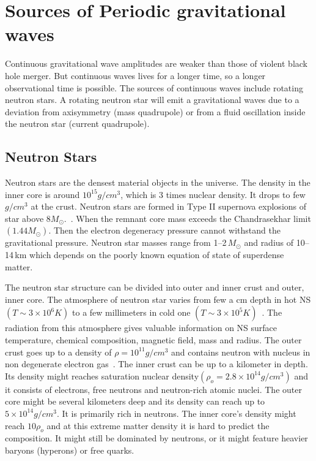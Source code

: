 \documentclass{ttuthes2007}
\begin{document}
\section{Sources of Periodic gravitational waves}
Continuous gravitational wave amplitudes are weaker than those of violent black
hole merger. But continuous waves lives for a longer time, so a longer
observational time is possible. The sources of continuous waves include
rotating neutron stars. A
rotating neutron star will emit a gravitational waves due to a deviation from
axisymmetry (mass quadrupole) or from a fluid oscillation inside the neutron
star (current quadrupole). 

\subsection{Neutron Stars}

Neutron stars are the densest material objects in the universe. The density in
the inner core is around $10^{15} g/cm^3$,
which is 3 times nuclear density. It drops to few $g/cm^3$ at the crust. Neutron
stars
are formed in Type II supernova explosions of 
star above $8M_\odot$.~\cite{Lattimer_2004}. When the remnant core
mass exceeds the Chandrasekhar limit$(1.44M_\odot)$. Then the electron
degeneracy pressure cannot withstand the gravitational pressure. Neutron star
masses range from 1--2\,$M_\odot$ and radius of 10--14\,km which depends on
the poorly known equation of state of superdense matter. 
	
The neutron star structure can be divided into outer and inner crust and outer, inner
core. The atmosphere of neutron star varies
from few a cm depth in hot \ac{NS}$(T\sim3\times10^6K)$ to a few millimeters in cold one
$(T\sim3\times10^5K)$~\cite{Haensel:2007yy}. The radiation from this atmosphere gives valuable
information on \ac{NS} surface temperature, chemical composition, magnetic
field, mass and radius. The outer crust goes up to a density of
$\rho=10^{11}g/cm^3$ and contains neutron with nucleus in non degenerate
electron gas~\cite{1976ApJ...208..550P}. The inner crust
can be up to a kilometer in depth. Its density might reaches saturation nuclear
density$(\rho_o=2.8\times10^{14}g/cm^3)$ and it consists of
electrons, free neutrons and neutron-rich atomic nuclei. The outer core might be
several kilometers deep and its density can reach up to $5\times10^{14}g/cm^3$.
It is
primarily rich in neutrons. The inner core's density might reach $10\rho_o$ and
at this extreme matter density it is hard to predict the composition. It might
still be dominated by neutrons, or it might feature heavier baryons (hyperons)
or free quarks. 
\end{document}
